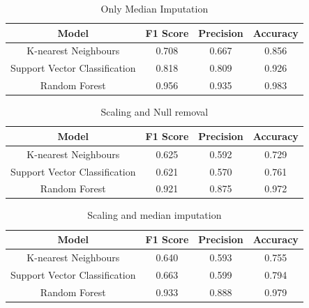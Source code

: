\documentclass[a4paper]{article}
\begin{document}

\begin{table}[h]
    \centering
    \begin{tabular}{|c|c|c|c|}
    \hline
    Model & F1 Score  & Precision  & Accuracy  \\
    \hline
    K-nearest Neighbours &  0.708 & 0.667 & 0.856 \\
    \hline
    Support Vector Classification & 0.818 & 0.809 & 0.926 \\
    \hline
    Random Forest & 0.956 & 0.935 & 0.983 \\
    \hline
    \end{tabular}
    \caption{Only Median Imputation}
    \label{tab:my_label}
\end{table}


\begin{table}[H]
    \centering
    \begin{tabular}{|c|c|c|c|}
    \hline
    Model & F1 Score & Precision & Accuracy  \\
    \hline
    K-nearest Neighbours & 0.625 & 0.592 & 0.729 \\
    \hline
    Support Vector Classification & 0.621 & 0.570 & 0.761 \\
    \hline
    Random Forest & 0.921 & 0.875 & 0.972 \\
    \hline
    \end{tabular}
    \caption{Scaling and Null removal}
    \label{tab:my_label}
\end{table}


\begin{table}[H]
    \centering
    \begin{tabular}{|c|c|c|c|}
    \hline
    Model & F1 Score  & Precision  & Accuracy  \\
    \hline
    K-nearest Neighbours & 0.640 & 0.593 & 0.755 \\
    \hline
    Support Vector Classification & 0.663 & 0.599 & 0.794 \\
    \hline
    Random Forest & 0.933 & 0.888 & 0.979 \\
    \hline
    \end{tabular}
    \caption{Scaling and median imputation}
    \label{tab:my_label}
\end{table}
\end{document}
